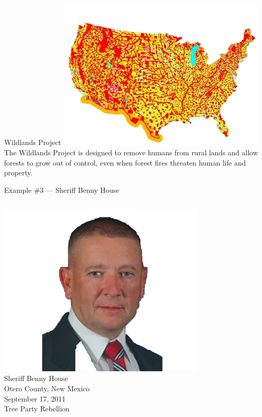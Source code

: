 \begin{frame}{Wildlands Project}
    \centering
    \includegraphics[width=0.75\textwidth]{img/wildlands.png} \\
    The Wildlands Project is designed to remove humans from rural lands and allow forests to grow out of control, even when forest fires threaten human life and property. \\
\end{frame}

\begin{frame}{Example \#3 --- Sheriff Benny House}
    \begin{columns}[onlytextwidth]
            \centering
            \includegraphics[width=0.75\textwidth]{img/benny-house.png} \\
            Sheriff Benny House \\
            Otero County, New Mexico \\

            September 17, 2011 \\
            \vspace{10pt}
            { \Large Tree Party Rebellion }
    \end{columns}
\end{frame}

